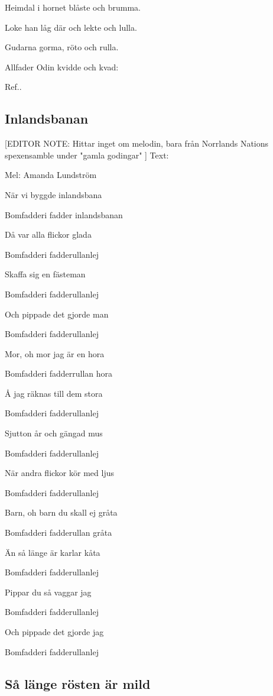 Heimdal i hornet blåste och brumma.

Loke han låg där och lekte och lulla.

Gudarna gorma, röto och rulla.

Allfader Odin kvidde och kvad:\bigskip

Ref.. \bigskip


\subsection{\textbf{Inlandsbanan}}

[EDITOR NOTE: Hittar inget om melodin, bara från Norrlands Nations spexensamble under "gamla godingar" ]
Text: 

Mel: Amanda Lundström\bigskip


När vi byggde inlandsbana

Bomfadderi fadder inlandsbanan

Då var alla flickor glada

Bomfadderi fadderullanlej

Skaffa sig en fästeman

Bomfadderi fadderullanlej

Och pippade det gjorde man 

Bomfadderi fadderullanlej\bigskip

Mor, oh mor jag är en hora

Bomfadderi fadderrullan hora

Å jag räknas till dem stora

Bomfadderi fadderullanlej

Sjutton år och gängad mus

Bomfadderi fadderullanlej

När andra flickor kör med ljus

Bomfadderi fadderullanlej\bigskip

Barn, oh barn du skall ej gråta

Bomfadderi fadderullan gråta

Än så länge är karlar kåta

Bomfadderi fadderullanlej

Pippar du så vaggar jag

Bomfadderi fadderullanlej

Och pippade det gjorde jag

Bomfadderi fadderullanlej 

\subsection{\textbf{Så länge rösten är mild}}

